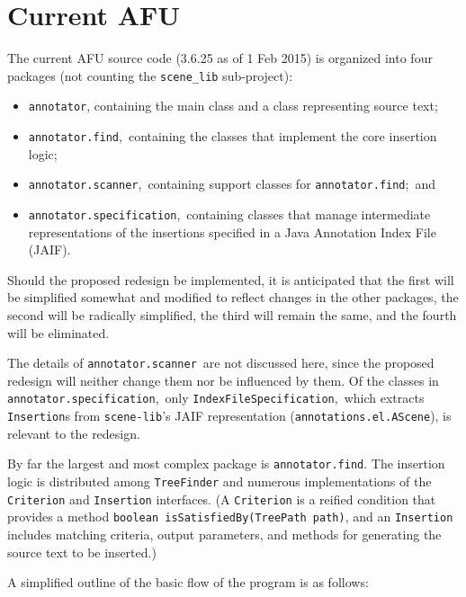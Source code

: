 \documentclass{article}
\begin{document}
\section{Current AFU}

The current AFU source code (3.6.25 as of 1 Feb 2015) is organized
into four packages (not counting the \texttt{scene\_lib} sub-project):
\begin{itemize}
\item  \texttt{annotator}, containing the main class and a class
representing source text;
\item  \texttt{annotator.find},\ containing the classes that implement
the core insertion logic;
\item  \texttt{annotator.scanner},\ containing support classes for
\texttt{annotator.find};\ and
\item  \texttt{annotator.specification},\ containing classes that
manage intermediate representations of the insertions specified in a
Java Annotation Index File (JAIF).
\end{itemize}
Should the proposed redesign be implemented, it is anticipated that the
first will be simplified somewhat and modified to reflect changes in the
other packages, the second will be radically simplified, the third will
remain the same, and the fourth will be eliminated.

The details of \texttt{annotator.scanner}\ are not discussed here, since
the proposed redesign will neither change them nor be influenced by
them.  Of the classes in \texttt{annotator.specification},\ only
\texttt{IndexFileSpecification},\ which extracts \texttt{Insertion}s
from \texttt{scene-lib}'s JAIF representation
(\texttt{annotations.el.AScene}), is relevant to the redesign.

By far the largest and most complex package is \texttt{annotator.find}.
The insertion logic is distributed among \texttt{TreeFinder} and
numerous implementations of the \texttt{Criterion} and
\texttt{Insertion} interfaces.  (A \texttt{Criterion} is a reified
condition that provides a method
\texttt{boolean isSatisfiedBy(TreePath path)},
and an \texttt{Insertion} includes matching criteria, output parameters,
and methods for generating the source text to be inserted.)

A simplified outline of the basic flow of the program is as follows:
\end{document}
